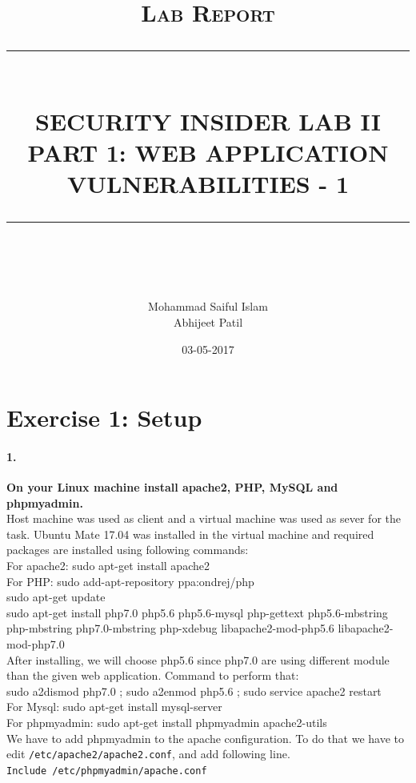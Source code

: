 \documentclass[12pt]{report}
\newcommand{\HRule}[1]{\rule{\linewidth}{#1}}
\begin{document}
	
	\title{ \normalsize \textsc{Lab Report}
			\\ [2.0cm]
			\HRule{0.5pt} \\
			\LARGE \textbf{\uppercase{Security Insider Lab II \\
			Part 1: Web Application Vulnerabilities - 1}}
			\HRule{2pt} \\ [0.5cm]
			\normalsize \vspace*{5\baselineskip}}
	\date{03-05-2017}
	\author{
			Mohammad Saiful Islam \\
			Abhijeet Patil }
	\maketitle
	\newpage
		
		
	\section*{Exercise 1: Setup}
	\paragraph*{1.} {\bf On your Linux machine install apache2, PHP, MySQL and phpmyadmin.}\\ 
	Host machine was used as client and a virtual machine was used as sever for the task. Ubuntu Mate 17.04 was installed in the virtual machine and required packages are installed using following commands:\\
	For apache2: {\selectfont
	sudo apt-get install apache2}\\
	For PHP:
	{\selectfont
	sudo add-apt-repository ppa:ondrej/php\\
	sudo apt-get update\\
	sudo apt-get install php7.0 php5.6 php5.6-mysql php-gettext php5.6-mbstring php-mbstring php7.0-mbstring php-xdebug libapache2-mod-php5.6 libapache2-mod-php7.0}\\
	After installing, we will choose php5.6 since php7.0 are using different module than the given web application. Command to perform that:\\
	{\selectfont
	sudo a2dismod php7.0 ; sudo a2enmod php5.6 ; sudo service apache2 restart}\\
	For Mysql:
	{\selectfont
	sudo apt-get install mysql-server}\\
	For phpmyadmin: 
	{\selectfont 
	sudo apt-get install phpmyadmin apache2-utils}\\
	We have to add phpmyadmin to the apache configuration. To do that we have to edit {\tt /etc/apache2/apache2.conf}, and add following line. \\
	{\tt Include /etc/phpmyadmin/apache.conf}
	
\end{document}
